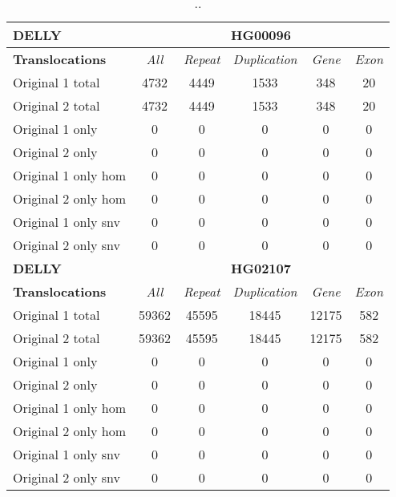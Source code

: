 \begin{table}[htb]
\begin{center}
\begin{tabular}{|l|c||c|c|c|c|}
\hline
{\bf DELLY} & \multicolumn{5}{|c|}{\bf HG00096} \\
\hline
\cline{2-6}
{\bf Translocations} & {\it All} & {\it Repeat} & {\it Duplication} & {\it Gene} & {\it Exon} \\
\hline
Original 1 total & 4732 & 4449 & 1533 & 348 & 20\\ 
\hline
Original 2 total & 4732 & 4449 & 1533 & 348 & 20\\ 
\hline
Original 1 only & 0 & 0 & 0 & 0 & 0\\ 
\hline
Original 2 only & 0 & 0 & 0 & 0 & 0\\ 
\hline
Original 1 only hom & 0 & 0 & 0 & 0 & 0\\ 
\hline
Original 2 only hom & 0 & 0 & 0 & 0 & 0\\ 
\hline
Original 1 only snv & 0 & 0 & 0 & 0 & 0\\ 
\hline
Original 2 only snv & 0 & 0 & 0 & 0 & 0\\ 
\hline
\hline
{\bf DELLY} & \multicolumn{5}{|c|}{\bf HG02107} \\
\hline
\cline{2-6}
{\bf Translocations} & {\it All} & {\it Repeat} & {\it Duplication} & {\it Gene} & {\it Exon} \\
\hline
Original 1 total & 59362 & 45595 & 18445 & 12175 & 582\\ 
\hline
Original 2 total & 59362 & 45595 & 18445 & 12175 & 582\\ 
\hline
Original 1 only & 0 & 0 & 0 & 0 & 0\\ 
\hline
Original 2 only & 0 & 0 & 0 & 0 & 0\\ 
\hline
Original 1 only hom & 0 & 0 & 0 & 0 & 0\\ 
\hline
Original 2 only hom & 0 & 0 & 0 & 0 & 0\\ 
\hline
Original 1 only snv & 0 & 0 & 0 & 0 & 0\\ 
\hline
Original 2 only snv & 0 & 0 & 0 & 0 & 0\\ 
\hline
\end{tabular}
\end{center}
\caption{ .. }
\label{tab:orig-vs-orig2-delly-trans}
\end{table}

